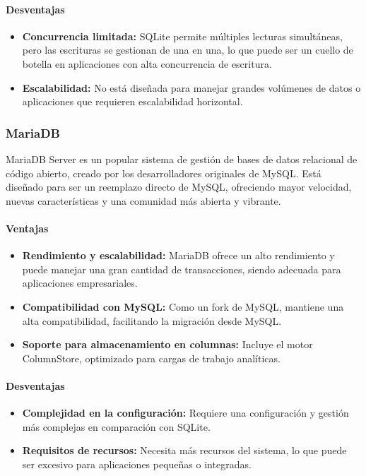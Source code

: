 \paragraph{Desventajas}
\begin{itemize}
    \item \textbf{Concurrencia limitada:} SQLite permite múltiples lecturas simultáneas, pero las escrituras se gestionan de una en una, lo que puede ser un cuello de botella en aplicaciones con alta concurrencia de escritura.
    \item \textbf{Escalabilidad:} No está diseñada para manejar grandes volúmenes de datos o aplicaciones que requieren escalabilidad horizontal.
\end{itemize}

\subsubsection{MariaDB}
MariaDB Server es un popular sistema de gestión de bases de datos relacional de código abierto, creado por los desarrolladores originales de MySQL. Está diseñado para ser un reemplazo directo de MySQL, ofreciendo mayor velocidad, nuevas características y una comunidad más abierta y vibrante.

\paragraph{Ventajas}
\begin{itemize}
    \item \textbf{Rendimiento y escalabilidad:} MariaDB ofrece un alto rendimiento y puede manejar una gran cantidad de transacciones, siendo adecuada para aplicaciones empresariales.
    \item \textbf{Compatibilidad con MySQL:} Como un fork de MySQL, mantiene una alta compatibilidad, facilitando la migración desde MySQL.
    \item \textbf{Soporte para almacenamiento en columnas:} Incluye el motor ColumnStore, optimizado para cargas de trabajo analíticas.
\end{itemize}

\paragraph{Desventajas}
\begin{itemize}
    \item \textbf{Complejidad en la configuración:} Requiere una configuración y gestión más complejas en comparación con SQLite.
    \item \textbf{Requisitos de recursos:} Necesita más recursos del sistema, lo que puede ser excesivo para aplicaciones pequeñas o integradas.
\end{itemize}

